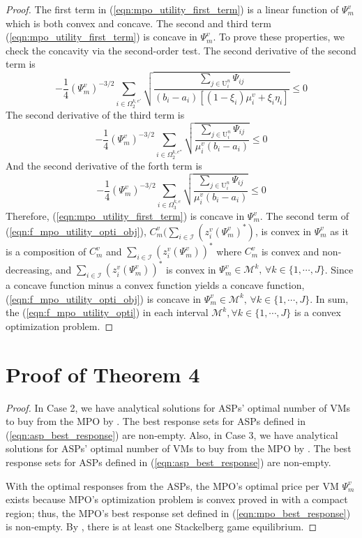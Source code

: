 \documentclass[10pt,journal, compsoc]{IEEEtran}
\begin{document}
\begin{proof}
    
    The first term in (\ref{eqn:mpo_utility_first_term}) is a linear function of $\Psi_m^v$ which is both convex and concave. The second and third term (\ref{eqn:mpo_utility_first_term}) is concave in $\Psi_m^v$. To prove these properties, we check the concavity via the second-order test. The second derivative of the second term is
    \begin{equation}
    -\frac{1}{4}(\Psi_m^v)^{-3/2}\sum_{i \in \Omega_2^{k,e'}} \sqrt{\frac{\sum_{j \in \mathrm{U}_i^n}\Psi_{ij}}{(b_i-a_i)[(1-\xi_i)\mu_i^v + \xi_i \eta_i]}} \leq 0
    \end{equation}
    The second derivative of the third term is
    \begin{equation}
    -\frac{1}{4}(\Psi_m^v)^{-3/2}\sum_{i \in \Omega_2^{k,e''}} \sqrt{\frac{\sum_{j \in \mathrm{U}_i^n}\Psi_{ij}}{\mu_i^v(b_i-a_i)}} \leq 0
    \end{equation}
    And the second derivative of the forth term is
    \begin{equation}
    -\frac{1}{4}(\Psi_m^v)^{-3/2}\sum_{i \in \Omega_3^{k,e}} \sqrt{\frac{\sum_{j \in \mathrm{U}_i^n}\Psi_{ij}}{\mu_i^v(b_i-a_i)}} \leq 0
    \end{equation}
    Therefore, (\ref{eqn:mpo_utility_first_term}) is concave in $\Psi_m^v$. The second term of (\ref{eqn:f_mpo_utility_opti_obj}), $C_m^v\big(\sum_{i \in \mathcal{I}} (z_{i}^v(\Psi_m^v)^*)$, is convex in $\Psi_m^v$ as it is a composition of $C_m^v$ and $\sum_{i \in \mathcal{I}} (z_{i}^v(\Psi_m^v))^*$ where $C_m^v$ is convex and non-decreasing, and $\sum_{i \in \mathcal{I}} (z_{i}^v(\Psi_m^v))^*$ is convex in $\Psi_m^v \in \mathcal{M}^k,\, \forall k \in \{1, \cdots, J\}$. Since a concave function minus a convex function yields a concave function, (\ref{eqn:f_mpo_utility_opti_obj}) is concave in $\Psi_m^v \in \mathcal{M}^k,\, \forall k \in \{1, \cdots, J\}$. In sum, the (\ref{eqn:f_mpo_utility_opti}) in each interval $\mathcal{M}^k, \forall k \in \{1, \cdots, J\}$ is a convex optimization problem. \qedhere
    \end{proof}
  \section{Proof of Theorem 4}\label{appendix:theorem_4}
    \begin{proof}
    In Case 2, we have analytical solutions for ASPs' optimal number of VMs to buy from the MPO by . The best response sets for ASPs defined in (\ref{eqn:asp_best_response}) are non-empty. Also, in Case 3, we have analytical solutions for ASPs' optimal number of VMs to buy from the MPO by . The best response sets for ASPs defined in (\ref{eqn:asp_best_response}) are non-empty. 
    
    With the optimal responses from the ASPs, the MPO's optimal price per VM $\Psi_m^v$ exists because MPO's optimization problem is convex proved in  with a compact region; thus, the MPO's best response set defined in (\ref{eqn:mpo_best_response}) is non-empty. By , there is at least one Stackelberg game equilibrium.
    \end{proof}
\end{document}
